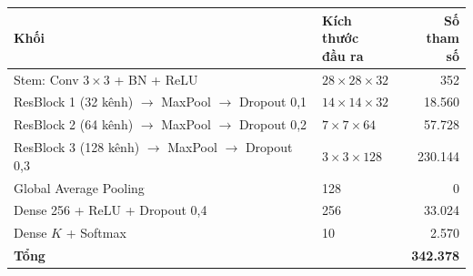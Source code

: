 \begin{tabular}{llr}
\toprule
Khối & \makecell[l]{Kích thước\\đầu ra} & \makecell[r]{Số tham\\số} \\
\midrule
Stem: Conv $3{\times}3$ + BN + ReLU & $28\times28\times32$ & 352 \\
ResBlock 1 (32 kênh) $\to$ MaxPool $\to$ Dropout 0{,}1 & $14\times14\times32$ & 18{.}560 \\
ResBlock 2 (64 kênh) $\to$ MaxPool $\to$ Dropout 0{,}2 & $7\times7\times64$ & 57{.}728 \\
ResBlock 3 (128 kênh) $\to$ MaxPool $\to$ Dropout 0{,}3 & $3\times3\times128$ & 230{.}144 \\
Global Average Pooling & 128 & 0 \\
Dense 256 + ReLU + Dropout 0,4 & 256 & 33{.}024 \\
Dense $K$ + Softmax & 10 & 2{.}570 \\
\midrule
\textbf{Tổng} &  & \textbf{342{.}378} \\
\bottomrule
\end{tabular}
